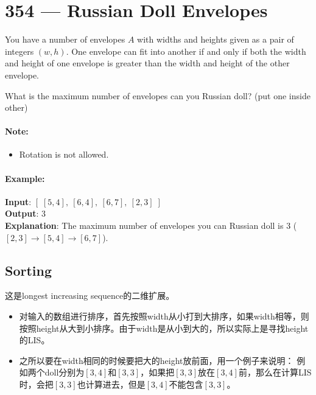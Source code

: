 \section{354 --- Russian Doll Envelopes}
You have a number of envelopes $A$ with widths and heights given as a pair of integers $(w, h)$. One envelope can fit into another if and only if both the width and height of one envelope is greater than the width and height of the other envelope.

What is the maximum number of envelopes can you Russian doll? (put one inside other)

\paragraph{Note:}
\begin{itemize}
\item Rotation is not allowed.
\end{itemize}

\paragraph{Example:}

\begin{flushleft}
\textbf{Input}: $\left[\;[5,4],\ [6,4],\ [6,7],\ [2,3]\;\right]$
\\
\textbf{Output}: 3 
\\
\textbf{Explanation}: The maximum number of envelopes you can Russian doll is 3 ($[2,3] \longrightarrow [5,4] \longrightarrow [6,7]$).
\end{flushleft}

\subsection{Sorting}
这是longest increasing sequence的二维扩展。
\begin{itemize}
\item 对输入的数组进行排序，首先按照width从小打到大排序，如果width相等，则按照height从大到小排序。由于width是从小到大的，所以实际上是寻找height的LIS。
\item 之所以要在width相同的时候要把大的height放前面，用一个例子来说明： 例如两个doll分别为$[3, 4]$和$[3, 3]$，如果把$[3,3]$放在$[3,4]$前，那么在计算LIS时，会把$[3,3]$也计算进去，但是$[3,4]$不能包含$[3,3]$。
\end{itemize}

